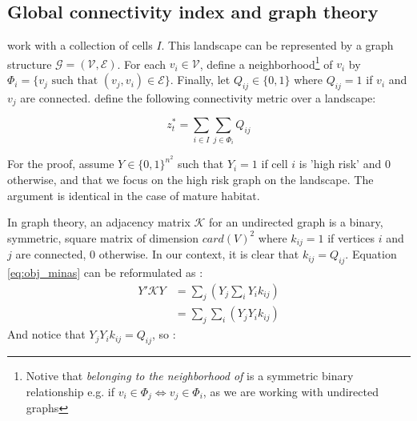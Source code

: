 
\subsection{Global connectivity index and graph theory}

\label{sec:connectivity}


\cite{minas_spatial_2014} work with a collection of cells $I$. This landscape can be represented by a graph structure $\mathcal{G}=(\mathcal{V}, \mathcal{E})$.
For each $v_i \in \mathcal{V}$, define a neighborhood\footnote{Notive that \textit{belonging to the neighborhood of} is a symmetric binary relationship e.g. if $v_i \in \Phi_j \iff v_j \in \Phi_i$, as we are working with undirected graphs} of $v_i$ by $\Phi_i = \{ v_j \text{ such that } (v_j, v_i) \in \mathcal{E} \}$. 
Finally, let $Q_{ij} \in \{0,1\}$ where $Q_{ij}=1$ if $v_i$ and $v_j$ are connected. \cite{minas_spatial_2014} define the following connectivity metric over a landscape: 

\begin{equation}
    z^*_t = \sum_{i \in I}\sum_{j \in \Phi_i}Q_{ij}
    \label{eq:obj_minas}
\end{equation}

For the proof, assume $Y \in \{0,1\}^{n^2}$ such that $Y_i=1$ if cell $i$ is 'high risk' and $0$ otherwise, and that we focus on the high risk graph on the landscape. The argument is identical in the case of mature habitat. 

In graph theory, an adjacency matrix $\mathcal{K}$ for an undirected graph is a binary, symmetric, square matrix of dimension $card(V)^2$ where $k_{ij}=1$ if vertices $i$ and $j$ are connected, $0$ otherwise. In our context, it is clear that $k_{ij}=Q_{ij}$. Equation \ref{eq:obj_minas} can be reformulated as : 
\begin{align*}
    Y' \mathcal{K} Y &= \sum_j\left( Y_j \sum_i Y_i k_{ij}\right)\\
    &= \sum_j \sum_i \left( Y_j Y_i k_{ij}\right)
\end{align*}
And notice that $Y_j Y_i k_{ij} = Q_{ij}$, so :

